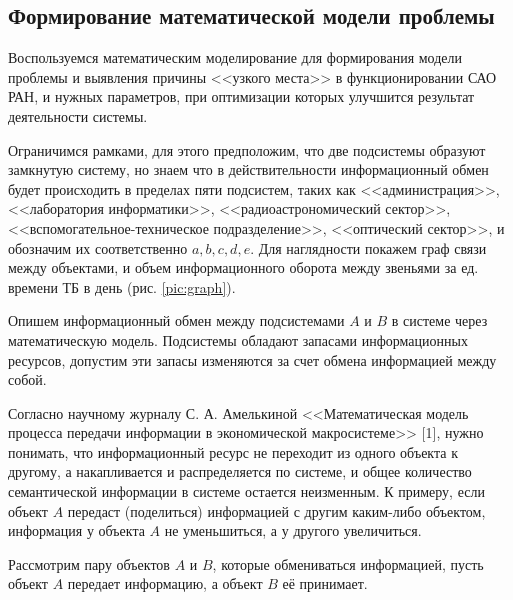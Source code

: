 \subsection{Формирование математической модели проблемы}
Воспользуемся математическим моделирование для формирования модели проблемы и выявления причины <<узкого места>> в функционировании САО РАН, и нужных параметров, при оптимизации которых улучшится результат деятельности системы.

Ограничимся рамками, для этого предположим, что две подсистемы образуют замкнутую систему, но знаем что в действительности информационный обмен будет происходить в пределах пяти подсистем, таких как <<администрация>>, <<лаборатория информатики>>, <<радиоастрономический сектор>>, <<вспомогательное-техническое подразделение>>, <<оптический сектор>>, и обозначим их соответственно $a, b, c, d, e$. Для наглядности покажем граф связи между объектами, и объем информационного оборота между звеньями за ед. времени ТБ в день (рис. \ref{pic:graph}).


Опишем информационный обмен между подсистемами $A$ и $B$ в системе через математическую модель.
Подсистемы обладают запасами информационных ресурсов, допустим эти запасы изменяются за счет обмена информацией между собой. 


Согласно научному журналу С. А. Амелькиной <<Математическая модель процесса
передачи информации в экономической макросистеме>> [1], нужно понимать, что информационный ресурс не переходит из одного объекта к другому, а накапливается и распределяется по системе, и общее количество семантической информации в системе остается неизменным. К примеру, если объект $A$ передаст (поделиться) информацией с другим каким-либо объектом, информация у объекта $A$ не уменьшиться, а у другого увеличиться.

Рассмотрим пару объектов $A$ и $B$, которые обмениваться информацией, пусть объект $A$ передает информацию, а объект $B$ её принимает.

